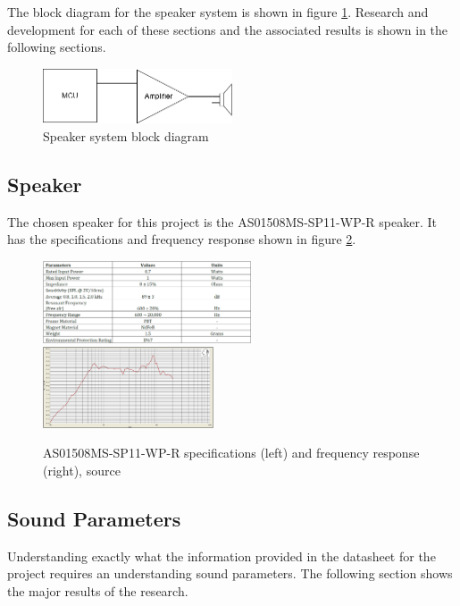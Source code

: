 \documentclass[12pt, a4paper]{article}
\begin{document}
The block diagram for the speaker system is shown in figure \ref{fig:speakerBlockDiagram}. Research and development for each of these sections and the associated results is shown in the following sections.
\begin{figure}[!htb]
	\hfill\includegraphics[width=0.5\textwidth]{./Figures/Speaker_Block_Diagram}\hspace*{\fill}
	\caption{Speaker system block diagram}
	\label{fig:speakerBlockDiagram}
\end{figure}
\subsection{Speaker}
The chosen speaker for this project is the AS01508MS-SP11-WP-R speaker. It has the specifications and frequency response shown in figure \ref{fig:speakerDataSheet}.\\ 
\begin{figure}[!htb]
	\includegraphics[width=0.55\textwidth]{./Figures/Speaker_Specifications}
	\includegraphics[width=0.45\textwidth]{./Figures/Speaker_Freq_Response}
	\caption{AS01508MS-SP11-WP-R specifications (left) and frequency response (right), source \cite{speakerDatasheet}}
	\label{fig:speakerDataSheet}
\end{figure}
\subsection{Sound Parameters}
Understanding exactly what the information provided in the datasheet for the project requires an understanding sound parameters. The following section shows the major results of the research. 
\end{document}
